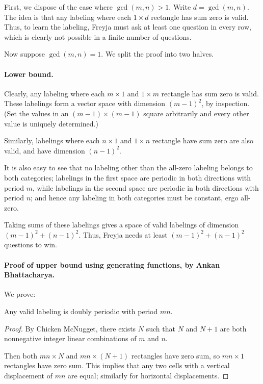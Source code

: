 \documentclass[11pt]{scrartcl}
\begin{document}
First, we dispose of the case where $\gcd(m, n) > 1$.
Write $d = \gcd(m, n)$.
The idea is that any labeling where each $1 \times d$ rectangle has sum zero is valid.
Thus, to learn the labeling, Freyja must ask at least one question in every row,
which is clearly not possible in a finite number of questions.

Now suppose $\gcd(m, n) = 1$.
We split the proof into two halves.

\paragraph{Lower bound.}
Clearly, any labeling where each $m \times 1$ and $1 \times m$ rectangle has sum zero is valid.
These labelings form a vector space with dimension $(m-1)^2$, by inspection.
(Set the values in an $(m-1)\times (m-1)$ square arbitrarily and every other
value is uniquely determined.)

Similarly, labelings where each $n \times 1$ and $1 \times n$ rectangle have sum
zero are also valid, and have dimension $(n-1)^2$.

It is also easy to see that no labeling other than the all-zero labeling
belongs to both categories;
labelings in the first space are periodic in both directions with period $m$,
while labelings in the second space are periodic in both directions with period $n$;
and hence any labeling in both categories must be constant, ergo all-zero.

Taking sums of these labelings gives a space of valid labelings
of dimension $(m-1)^2 + (n-1)^2$.
Thus, Freyja needs at least $(m-1)^2 + (n-1)^2$ questions to win.

\paragraph{Proof of upper bound using generating functions, by Ankan Bhattacharya.}
We prove:
\begin{claim*}[Periodicity]
  Any valid labeling is doubly periodic with period $mn$.
\end{claim*}
\begin{proof}
  By Chicken McNugget, there exists $N$ such that $N$ and $N+1$
  are both nonnegative integer linear combinations of $m$ and $n$.

  Then both $mn \times N$ and $mn \times (N+1)$ rectangles have zero sum,
  so $mn \times 1$ rectangles have zero sum.
  This implies that any two cells with a vertical displacement of $mn$ are equal;
  similarly for horizontal displacements.
\end{proof}
\end{document}
